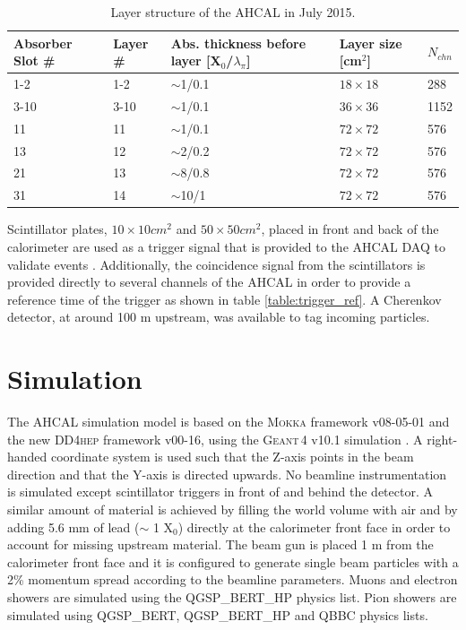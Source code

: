 \documentclass{JINST}
\newcommand\geant{\textsc{Geant\,4}\xspace}
\newcommand\mokka{\textsc{Mokka}\xspace}
\newcommand\ddhep{\textsc{DD4hep}\xspace}
\begin{document}
\begin{table}[htb!]
  \centering
  \caption{Layer structure of the AHCAL in July 2015.}
  \label{table:AHCALlayer_structure}
  \begin{tabular}{@{}lllll@{}}
    \toprule
    Absorber Slot \# & Layer \# & Abs. thickness before layer [X$_0$/$\lambda_{\pi}$] & Layer size [cm$^{2}$] & $N_{chn}$\\
    \midrule
    1-2 & 1-2 & $\sim$1/0.1 & $18\times18$ & 288\\
    3-10 & 3-10 & $\sim$1/0.1 & $36\times36$ & 1152\\
    11 & 11 & $\sim$1/0.1 & $72\times72$ & 576\\
    13 & 12 & $\sim$2/0.2 & $72\times72$ & 576\\
    21 & 13 & $\sim$8/0.8 & $72\times72$ & 576\\
    31 & 14 & $\sim$10/1 & $72\times72$ & 576\\
    \bottomrule
  \end{tabular}
\end{table}

Scintillator plates, $10\times10 cm^2$ and $50\times50 cm^2$, placed in front and back of the calorimeter are used as a trigger signal that is provided to the AHCAL DAQ to validate events \cite{Kvasnicka:CR_IEEE2016}. Additionally, the coincidence signal from the scintillators is provided directly to several channels of the AHCAL in order to provide a reference time of the trigger as shown in table \ref{table:trigger_ref}. A Cherenkov detector, at around 100 m upstream, was available to tag incoming particles.

\section{Simulation}

The AHCAL simulation model is based on the \mokka \cite{MoradeFreitas:2002kj} framework v08-05-01 and the new \ddhep \cite{Frank:2014zya} framework v00-16, using the \geant v10.1 simulation \cite{Agostinelli2003}. A right-handed coordinate system is used such that the Z-axis points in the beam direction and that the Y-axis is directed upwards. No beamline instrumentation is simulated except scintillator triggers in front of and behind the detector. A similar amount of material is achieved by filling the world volume with air and by adding 5.6 mm of lead ($\sim$ 1 X$_0$) directly at the calorimeter front face in order to account for missing upstream material. The beam gun is placed 1 m from the calorimeter front face and it is configured to generate single beam particles with a 2\% momentum spread according to the beamline parameters. Muons and electron showers are simulated using the QGSP\_BERT\_HP physics list. Pion showers are simulated using QGSP\_BERT, QGSP\_BERT\_HP and QBBC physics lists.
\end{document}
